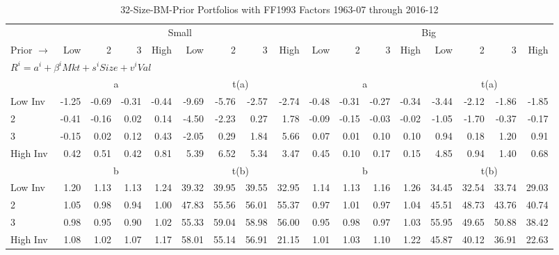 
\begin{table}[!ht]
\centering
\caption{32-Size-BM-Prior Portfolios with FF1993 Factors 1963-07 through 2016-12}
\begin{tabular}{lrrrrrrrrrrrrrrrr}
  \toprule
    & \multicolumn{8}{c}{Small} & \multicolumn{8}{c}{Big} \\
      \cmidrule(r){2-9} \cmidrule(r){10-17}
    Prior $\rightarrow$ & Low & 2 & 3 & High & Low & 2 & 3 & High & Low & 2 & 3 & High & Low & 2 & 3 & High \\ 
  \midrule
  \multicolumn{17}{l}{$R^i=a^i+\beta^iMkt+s^iSize+v^iVal$} \\

  
    
      & \multicolumn{4}{c}{a} & \multicolumn{4}{c}{t(a)}
    
      & \multicolumn{4}{c}{a} & \multicolumn{4}{c}{t(a)}
    
    \\
      \cmidrule(r){2-5} \cmidrule(r){6-9} \cmidrule(r){10-13} \cmidrule(r){14-17}

    Low Inv   & -1.25  & -0.69  & -0.31  & -0.44  & -9.69  & -5.76  & -2.57  & -2.74  & -0.48  & -0.31  & -0.27  & -0.34  & -3.44  & -2.12  & -1.86  & -1.85  \\
           2  & -0.41  & -0.16  & 0.02  & 0.14  & -4.50  & -2.23  & 0.27  & 1.78  & -0.09  & -0.15  & -0.03  & -0.02  & -1.05  & -1.70  & -0.37  & -0.17  \\
           3  & -0.15  & 0.02  & 0.12  & 0.43  & -2.05  & 0.29  & 1.84  & 5.66  & 0.07  & 0.01  & 0.10  & 0.10  & 0.94  & 0.18  & 1.20  & 0.91  \\
    High Inv  & 0.42  & 0.51  & 0.42  & 0.81  & 5.39  & 6.52  & 5.34  & 3.47  & 0.45  & 0.10  & 0.17  & 0.15  & 4.85  & 0.94  & 1.40  & 0.68  \\

  
    
      & \multicolumn{4}{c}{b} & \multicolumn{4}{c}{t(b)}
    
      & \multicolumn{4}{c}{b} & \multicolumn{4}{c}{t(b)}
    
    \\
      \cmidrule(r){2-5} \cmidrule(r){6-9} \cmidrule(r){10-13} \cmidrule(r){14-17}

    Low Inv   & 1.20  & 1.13  & 1.13  & 1.24  & 39.32  & 39.95  & 39.55  & 32.95  & 1.14  & 1.13  & 1.16  & 1.26  & 34.45  & 32.54  & 33.74  & 29.03  \\
           2  & 1.05  & 0.98  & 0.94  & 1.00  & 47.83  & 55.56  & 56.01  & 55.37  & 0.97  & 1.01  & 0.97  & 1.04  & 45.51  & 48.73  & 43.76  & 40.74  \\
           3  & 0.98  & 0.95  & 0.90  & 1.02  & 55.33  & 59.04  & 58.98  & 56.00  & 0.95  & 0.98  & 0.97  & 1.03  & 55.95  & 49.65  & 50.88  & 38.42  \\
    High Inv  & 1.08  & 1.02  & 1.07  & 1.17  & 58.01  & 55.14  & 56.91  & 21.15  & 1.01  & 1.03  & 1.10  & 1.22  & 45.87  & 40.12  & 36.91  & 22.63  \\


\end{tabular}
\end{table}
